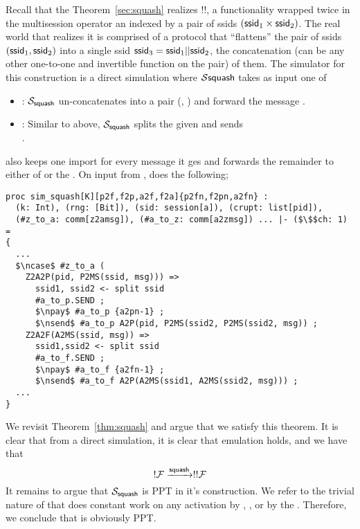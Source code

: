 Recall that the Theorem~\ref{sec:squash} realizes !!\F, a functionality wrapped twice in the multisession operator an indexed by a pair of ssids $(\mathsf{ssid}_1 \times \mathsf{ssid}_2)$.
The real world that realizes it is comprised of a protocol that ``flattens'' the pair of ssids $(\mathsf{ssid}_1, \mathsf{ssid}_2)$ into a single ssid $\mathsf{ssid}_3 = \mathsf{ssid}_1 || \mathsf{ssid}_2$, the concatenation (can be any other one-to-one and invertible function on the pair) of them.
The simulator for this construction is a direct simulation where $\mathcal{S}{\mathsf{squash}}$ takes as input one of 
\begin{itemize}
	\item {}: $\mathcal{S}_{\mathsf{squash}}$ un-concatenates  into a pair (, ) and forward the message .
	\item {}: Similar to above, $\mathcal{S}_{\mathsf{squash}}$ splits the given  and sends \\ . 
\end{itemize}

 also keeps one import for every message it ges and forwards the remainder to either of \F or the \partywrapper.
On input from \Z,  does the following; 

\begin{lstlisting}[basicstyle=\footnotesize\BeraMonottFamily, frame=single, mathescape]
proc sim_squash[K][p2f,f2p,a2f,f2a]{p2fn,f2pn,a2fn} :
  (k: Int), (rng: [Bit]), (sid: session[a]), (crupt: list[pid]),
  (#z_to_a: comm[z2amsg]), (#a_to_z: comm[a2zmsg]) ... |- ($\$$ch: 1) =
{
  ...
  $\ncase$ #z_to_a (
    Z2A2P(pid, P2MS(ssid, msg))) =>
      ssid1, ssid2 <- split ssid
      #a_to_p.SEND ;
      $\npay$ #a_to_p {a2pn-1} ;
      $\nsend$ #a_to_p A2P(pid, P2MS(ssid2, P2MS(ssid2, msg)) ;
    Z2A2F(A2MS(ssid, msg)) =>
      ssid1,ssid2 <- split ssid
      #a_to_f.SEND ; 
      $\npay$ #a_to_f {a2fn-1} ;
	  $\nsend$ #a_to_f A2P(A2MS(ssid1, A2MS(ssid2, msg))) ;
  ...
}	  
\end{lstlisting}

We revisit Theorem~\ref{thm:squash} and argue that we satisfy this theorem. 
It is clear that from a direct simulation, it is clear that emulation holds, and we have that 
\[
	!\mathcal{F} \xrightarrow{\mathsf{squash}} !!\mathcal{F}
\] 
It remains to argue that $\mathcal{S}_{\mathsf{squash}}$ is PPT in it's construction. We refer to the trivial nature of  that does constant work on any activation by \F, \Z, or by the \partywrapper. Therefore, we conclude that  is obviously PPT.


